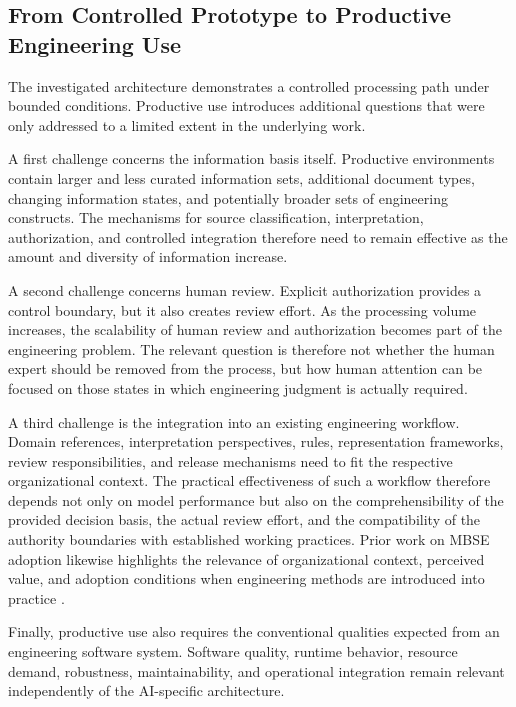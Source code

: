 \subsection{From Controlled Prototype to Productive Engineering Use}
\label{sec:discussion_productive_use}

The investigated architecture demonstrates a controlled processing path under bounded
conditions. Productive use introduces additional questions that were only addressed to a
limited extent in the underlying work.

A first challenge concerns the information basis itself. Productive environments contain
larger and less curated information sets, additional document types, changing information
states, and potentially broader sets of engineering constructs. The mechanisms for source
classification, interpretation, authorization, and controlled integration therefore need to
remain effective as the amount and diversity of information increase.

A second challenge concerns human review. Explicit authorization provides a control
boundary, but it also creates review effort. As the processing volume increases, the
scalability of human review and authorization becomes part of the engineering problem.
The relevant question is therefore not whether the human expert should be removed from the
process, but how human attention can be focused on those states in which engineering
judgment is actually required.

A third challenge is the integration into an existing engineering workflow. Domain
references, interpretation perspectives, rules, representation frameworks, review
responsibilities, and release mechanisms need to fit the respective organizational
context. The practical effectiveness of such a workflow therefore depends not only on model
performance but also on the comprehensibility of the provided decision basis, the actual
review effort, and the compatibility of the authority boundaries with established working
practices. Prior work on MBSE adoption likewise highlights the relevance of organizational
context, perceived value, and adoption conditions when engineering methods are introduced
into practice \cite{Henderson2024,Call2022,Campo2023,Nanfuka2023}.

Finally, productive use also requires the conventional qualities expected from an
engineering software system. Software quality, runtime behavior, resource demand,
robustness, maintainability, and operational integration remain relevant independently of
the AI-specific architecture.

